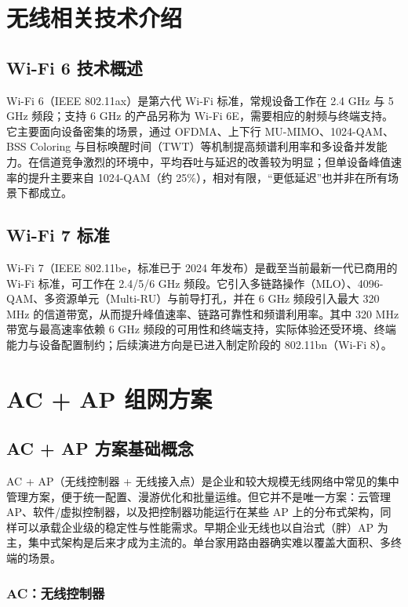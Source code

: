 \documentclass[UTF8]{ctexbook}
\begin{document}
\chapter{无线相关技术介绍}

\section{Wi-Fi 6 技术概述}

Wi-Fi 6（IEEE 802.11ax）是第六代 Wi-Fi 标准，常规设备工作在 2.4 GHz 与 5 GHz 频段；支持 6 GHz 的产品另称为 Wi-Fi 6E，需要相应的射频与终端支持。它主要面向设备密集的场景，通过 OFDMA、上下行 MU-MIMO、1024-QAM、BSS Coloring 与目标唤醒时间（TWT）等机制提高频谱利用率和多设备并发能力。在信道竞争激烈的环境中，平均吞吐与延迟的改善较为明显；但单设备峰值速率的提升主要来自 1024-QAM（约 25\%），相对有限，\textquotedblleft 更低延迟\textquotedblright 也并非在所有场景下都成立。

\section{Wi-Fi 7 标准}

Wi-Fi 7（IEEE 802.11be，标准已于 2024 年发布）是截至当前最新一代已商用的 Wi-Fi 标准，可工作在 2.4/5/6 GHz 频段。它引入多链路操作（MLO）、4096-QAM、多资源单元（Multi-RU）与前导打孔，并在 6 GHz 频段引入最大 320 MHz 的信道带宽，从而提升峰值速率、链路可靠性和频谱利用率。其中 320 MHz 带宽与最高速率依赖 6 GHz 频段的可用性和终端支持，实际体验还受环境、终端能力与设备配置制约；后续演进方向是已进入制定阶段的 802.11bn（Wi-Fi 8）。

\chapter{AC + AP 组网方案}

\section{AC + AP 方案基础概念}

AC + AP（无线控制器 + 无线接入点）是企业和较大规模无线网络中常见的集中管理方案，便于统一配置、漫游优化和批量运维。但它并不是唯一方案：云管理 AP、软件/虚拟控制器，以及把控制器功能运行在某些 AP 上的分布式架构，同样可以承载企业级的稳定性与性能需求。早期企业无线也以自治式（胖）AP 为主，集中式架构是后来才成为主流的。单台家用路由器确实难以覆盖大面积、多终端的场景。

\subsection{AC：无线控制器}
\end{document}
